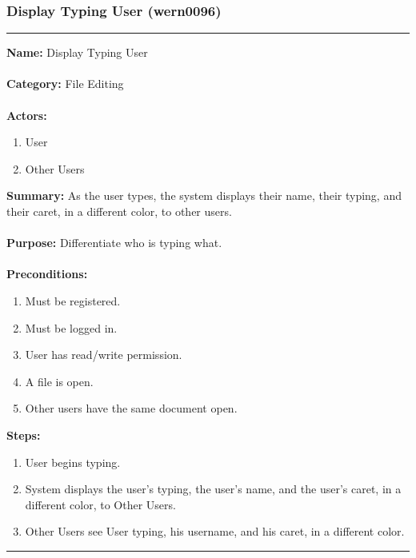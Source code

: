 \documentclass[11pt]{report}
\begin{document}
\newpage

\subsubsection{Display Typing User (wern0096)}
\vspace{2pt}
\hrule
\vspace{8pt}
	\noindent\textbf{Name:} Display Typing User \\ \\
	\textbf{Category:} File Editing \\ \\
	\textbf{Actors:} 
	\begin{enumerate}
		\item User
		\item Other Users
	\end{enumerate}
	\textbf{Summary:} As the user types, the system displays their name, their typing, and their caret, in a different color, to other users. \\ \\
	\textbf{Purpose:} Differentiate who is typing what. \\ \\
	\textbf{Preconditions:} 
	\begin{enumerate}
		\item Must be registered.
		\item Must be logged in.
		\item User has read/write permission.
		\item A file is open.
		\item Other users have the same document open.
	\end{enumerate}
	\textbf{Steps:}
	\begin{enumerate}
		\item User begins typing.
		\item System displays the user's typing, the user's name, and the user's caret, in a different color, to Other Users.
		\item Other Users see User typing, his username, and his caret, in a different color.
	\end{enumerate}
\hrule
\vspace{8pt}

\newpage
\end{document}
